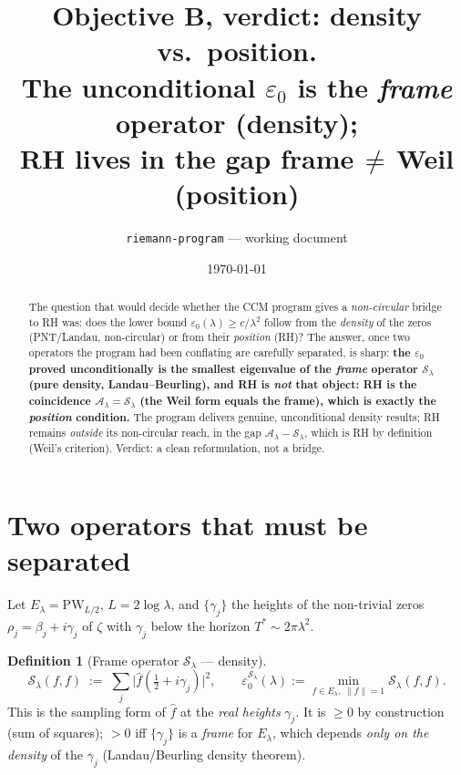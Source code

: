 \documentclass[11pt]{article}
\title{\textbf{Objective B, verdict: density vs.\ position.\\
The unconditional $\varepsilon_0$ is the \emph{frame} operator (density);\\
RH lives in the gap frame$\,\ne\,$Weil (position)}}
\author{\texttt{riemann-program} --- working document}
\date{\today}
\theoremstyle{plain}
\theoremstyle{definition}
\newtheorem{definition}{Definition}
\newcommand{\half}{\tfrac12}
\newcommand{\El}{E_\lambda}
\newcommand{\Sframe}{\mathcal S_\lambda}
\newcommand{\Aweil}{\mathcal A_\lambda}
\begin{document}
\maketitle

\begin{abstract}
The question that would decide whether the CCM program gives a \emph{non-circular}
bridge to RH was: does the lower bound $\varepsilon_0(\lambda)\ge c/\lambda^2$ follow
from the \emph{density} of the zeros (PNT/Landau, non-circular) or from their
\emph{position} (RH)? The answer, once two operators the program had been conflating
are carefully separated, is sharp: \textbf{the $\varepsilon_0$ proved unconditionally
is the smallest eigenvalue of the \emph{frame} operator $\Sframe$ (pure density,
Landau--Beurling), and RH is \emph{not} that object: RH is the coincidence
$\Aweil=\Sframe$ (the Weil form equals the frame), which is exactly the
\emph{position} condition.} The program delivers genuine, unconditional density
results; RH remains \emph{outside} its non-circular reach, in the gap
$\Aweil-\Sframe$, which is RH by definition (Weil's criterion). Verdict: a clean
reformulation, not a bridge.
\end{abstract}

\tableofcontents

\section{Two operators that must be separated}\label{sec:two}

Let $\El=\mathrm{PW}_{L/2}$, $L=2\log\lambda$, and $\{\gamma_j\}$ the heights of the
non-trivial zeros $\rho_j=\beta_j+i\gamma_j$ of $\zeta$ with $\gamma_j$ below the
horizon $T^*\sim2\pi\lambda^2$.

\begin{definition}[Frame operator $\Sframe$ --- density]
\[
  \Sframe(f,f)\;:=\;\sum_{j}\bigl|\widehat f(\half+i\gamma_j)\bigr|^2,
  \qquad
  \varepsilon_0^{\Sframe}(\lambda):=\min_{f\in\El,\;\|f\|=1}\Sframe(f,f).
\]
This is the sampling form of $\widehat f$ at the \emph{real heights} $\gamma_j$.
It is $\ge0$ by construction (sum of squares); $>0$ iff $\{\gamma_j\}$ is a
\emph{frame} for $\El$, which depends \emph{only on the density} of the
$\gamma_j$ (Landau/Beurling density theorem).
\end{definition}
\end{document}
